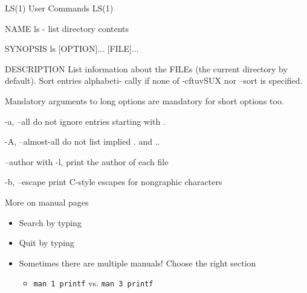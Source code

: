     \begin{frame}[t,fragile]{}
        \begin{bashenv}[\tiny]
LS(1)                                        User Commands                                       LS(1)

NAME
       ls - list directory contents

SYNOPSIS
       ls [OPTION]... [FILE]...

DESCRIPTION
       List  information  about the FILEs (the current directory by default).  Sort entries alphabeti-
       cally if none of -cftuvSUX nor --sort is specified.

       Mandatory arguments to long options are mandatory for short options too.

       -a, --all
              do not ignore entries starting with .

       -A, --almost-all
              do not list implied . and ..

       --author
              with -l, print the author of each file

       -b, --escape
              print C-style escapes for nongraphic characters
        \end{bashenv}
    \end{frame}

    \begin{frame}[t,fragile]{More on manual pages}
        \begin{itemize}
            \item{Search by typing \keys{/}}
            \item{Quit by typing }
            \item{Sometimes there are multiple manuals! \textrightarrow \: Choose the right section}
            \begin{itemize}
                \item{\texttt{man 1 printf} vs. \texttt{man 3 printf}}
            \end{itemize}
        \end{itemize}
    \end{frame}

